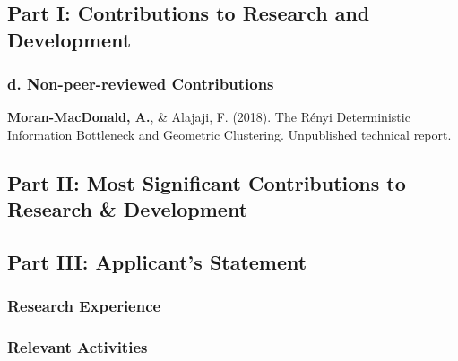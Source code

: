 \documentclass[a4paper,12pt]{article}
\begin{document}
\subsection*{Part I: Contributions to Research and Development}
\subsubsection*{d. Non-peer-reviewed Contributions}
\textbf{Moran-MacDonald, A.}, \& Alajaji, F. (2018). The R\'{e}nyi Deterministic
Information Bottleneck and Geometric Clustering. Unpublished technical report. 

\subsection*{Part II: Most Significant Contributions to Research \& Development}

\subsection*{Part III: Applicant's Statement}
\subsubsection*{Research Experience}

\subsubsection*{Relevant Activities}
\end{document}
